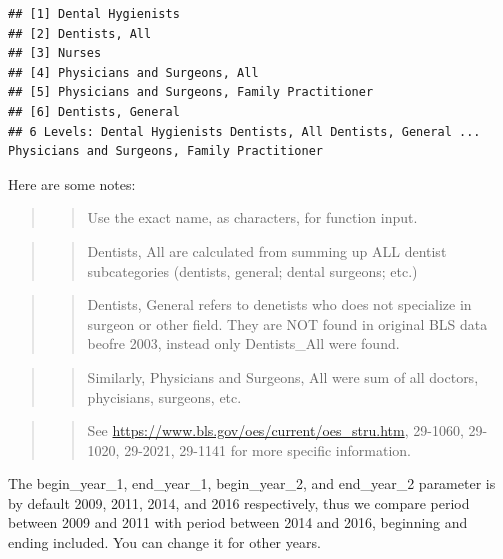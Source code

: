 \documentclass[
]{article}
\begin{document}
\begin{verbatim}
## [1] Dental Hygienists                           
## [2] Dentists, All                               
## [3] Nurses                                      
## [4] Physicians and Surgeons, All                
## [5] Physicians and Surgeons, Family Practitioner
## [6] Dentists, General                           
## 6 Levels: Dental Hygienists Dentists, All Dentists, General ... Physicians and Surgeons, Family Practitioner
\end{verbatim}

Here are some notes:

\begin{quote}
\begin{quote}
Use the exact name, as characters, for function input.
\end{quote}
\end{quote}

\begin{quote}
\begin{quote}
Dentists, All are calculated from summing up ALL dentist subcategories
(dentists, general; dental surgeons; etc.)
\end{quote}
\end{quote}

\begin{quote}
\begin{quote}
Dentists, General refers to denetists who does not specialize in surgeon
or other field. They are NOT found in original BLS data beofre 2003,
instead only Dentists\_All were found.
\end{quote}
\end{quote}

\begin{quote}
\begin{quote}
Similarly, Physicians and Surgeons, All were sum of all doctors,
phycisians, surgeons, etc.
\end{quote}
\end{quote}

\begin{quote}
\begin{quote}
See \url{https://www.bls.gov/oes/current/oes_stru.htm}, 29-1060,
29-1020, 29-2021, 29-1141 for more specific information.
\end{quote}
\end{quote}

The begin\_year\_1, end\_year\_1, begin\_year\_2, and end\_year\_2
parameter is by default 2009, 2011, 2014, and 2016 respectively, thus we
compare period between 2009 and 2011 with period between 2014 and 2016,
beginning and ending included. You can change it for other years.
\end{document}
